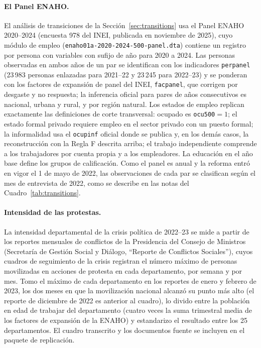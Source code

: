 \paragraph{El Panel ENAHO.} El análisis de transiciones de la Sección~\ref{sec:transitions} usa el Panel ENAHO 2020--2024 (encuesta 978 del INEI, publicada en noviembre de 2025), cuyo módulo de empleo (\texttt{enaho01a-2020-2024-500-panel.dta}) contiene un registro por persona con variables con sufijo de año para 2020 a 2024. Las personas observadas en ambos años de un par se identifican con los indicadores \texttt{perpanel} (23\,983 personas enlazadas para 2021--22 y 23\,245 para 2022--23) y se ponderan con los factores de expansión de panel del INEI, \texttt{facpanel}, que corrigen por desgaste y no respuesta; la inferencia oficial para pares de años consecutivos es nacional, urbana y rural, y por región natural. Los estados de empleo replican exactamente las definiciones de corte transversal: ocupado es \texttt{ocu500}${}=1$; el estado formal privado requiere empleo en el sector privado con un puesto formal; la informalidad usa el \texttt{ocupinf} oficial donde se publica y, en los demás casos, la reconstrucción con la Regla F descrita arriba; el trabajo independiente comprende a los trabajadores por cuenta propia y a los empleadores. La educación en el año base define los grupos de calificación. Como el panel es anual y la reforma entró en vigor el 1 de mayo de 2022, las observaciones de cada par se clasifican según el mes de entrevista de 2022, como se describe en las notas del Cuadro~\ref{tab:transitions}.

\paragraph{Intensidad de las protestas.} La intensidad departamental de la crisis política de 2022--23 se mide a partir de los reportes mensuales de conflictos de la Presidencia del Consejo de Ministros (Secretar\'ia de Gesti\'on Social y Di\'alogo, ``Reporte de Conflictos Sociales''), cuyos cuadros de seguimiento de la crisis registran el número máximo de personas movilizadas en acciones de protesta en cada departamento, por semana y por mes. Tomo el máximo de cada departamento en los reportes de enero y febrero de 2023, los dos meses en que la movilización nacional alcanzó su punto más alto (el reporte de diciembre de 2022 es anterior al cuadro), lo divido entre la población en edad de trabajar del departamento (cuatro veces la suma trimestral media de los factores de expansión de la ENAHO) y estandarizo el resultado entre los 25 departamentos. El cuadro transcrito y los documentos fuente se incluyen en el paquete de replicación.

